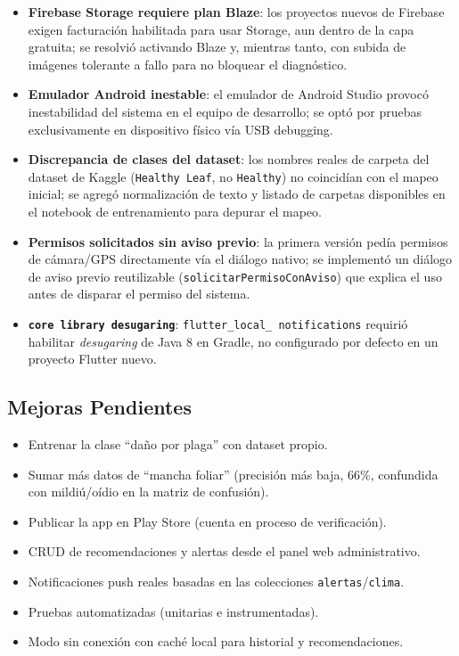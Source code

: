 \documentclass[12pt,a4paper]{article}
\begin{document}
\begin{itemize}
  \item \textbf{Firebase Storage requiere plan Blaze}: los proyectos nuevos de
        Firebase exigen facturación habilitada para usar Storage, aun dentro de
        la capa gratuita; se resolvió activando Blaze y, mientras tanto, con
        subida de imágenes tolerante a fallo para no bloquear el diagnóstico.
  \item \textbf{Emulador Android inestable}: el emulador de Android Studio
        provocó inestabilidad del sistema en el equipo de desarrollo; se optó
        por pruebas exclusivamente en dispositivo físico vía USB debugging.
  \item \textbf{Discrepancia de clases del dataset}: los nombres reales de
        carpeta del dataset de Kaggle (\texttt{Healthy Leaf}, no
        \texttt{Healthy}) no coincidían con el mapeo inicial; se agregó
        normalización de texto y listado de carpetas disponibles en el
        notebook de entrenamiento para depurar el mapeo.
  \item \textbf{Permisos solicitados sin aviso previo}: la primera versión
        pedía permisos de cámara/GPS directamente vía el diálogo nativo; se
        implementó un diálogo de aviso previo reutilizable
        (\texttt{solicitarPermisoConAviso}) que explica el uso antes de
        disparar el permiso del sistema.
  \item \textbf{\texttt{core library desugaring}}: \texttt{flutter\_local\_
        notifications} requirió habilitar \textit{desugaring} de Java 8 en
        Gradle, no configurado por defecto en un proyecto Flutter nuevo.
\end{itemize}

\subsection{Mejoras Pendientes}
\label{sec:mejoras-pendientes}

\begin{itemize}
  \item Entrenar la clase ``daño por plaga'' con dataset propio.
  \item Sumar más datos de ``mancha foliar'' (precisión más baja, 66\%,
        confundida con mildiú/oídio en la matriz de confusión).
  \item Publicar la app en Play Store (cuenta en proceso de verificación).
  \item CRUD de recomendaciones y alertas desde el panel web administrativo.
  \item Notificaciones push reales basadas en las colecciones
        \texttt{alertas}/\texttt{clima}.
  \item Pruebas automatizadas (unitarias e instrumentadas).
  \item Modo sin conexión con caché local para historial y recomendaciones.
\end{itemize}
\end{document}
